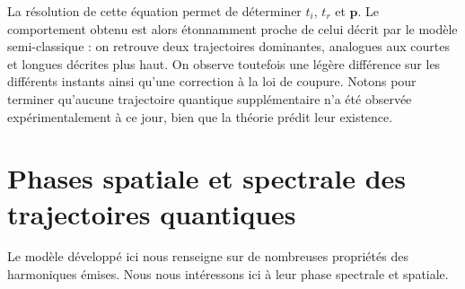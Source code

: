 La résolution de cette équation permet de déterminer $t_i$, $t_r$ et $\bm{p}$. Le comportement obtenu est alors étonnamment proche de celui décrit par le modèle semi-classique : on retrouve deux trajectoires dominantes, analogues aux courtes et longues décrites plus haut. On observe toutefois une légère différence sur les différents instants ainsi qu'une correction à la loi de coupure. Notons pour terminer qu'aucune trajectoire quantique supplémentaire n'a été observée expérimentalement à ce jour, bien que la théorie prédit leur existence.

\section{Phases spatiale et spectrale des trajectoires quantiques}
\label{sec:thTraj}
Le modèle développé ici nous renseigne sur de nombreuses propriétés des harmoniques émises. Nous nous intéressons ici à leur phase spectrale et spatiale.

